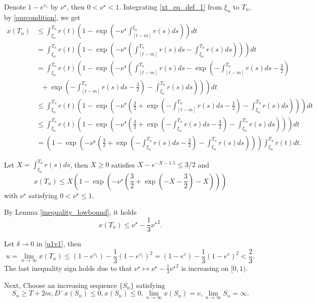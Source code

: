 \documentclass{HZNUMCM}
\begin{document}
Denote $1-e^{v_1}$ by $\nu^\star$, then $0<\nu^\star<1$. Integrating \eqref{xt_eq_def_1} from $\xi_n$ to $T_n$, by \eqref{ourcondition}, we get
\begin{align*}
x(T_n)&\leqslant \int_{\xi_n}^{T_n}r(t)\left(1-\exp\left(-\nu^\star\int_{[t-m]}^{\xi_n}r(s)ds\right)\right)dt\\
&= \int_{\xi_n}^{T_n}r(t)\left(1-\exp\left(-\nu^\star\left(\int_{[t-m]}^{T_n}r(s)ds-\int_{\xi_n}^{T_n}r(s)ds\right)\right)\right)dt\\
&= \int_{\xi_n}^{T_n}r(t)\left(1-\exp\left(-\nu^\star\left(\int_{[t-m]}^{T_n}r(s)ds-\exp{\left(-\int_{[t-m]}^{T_n}r(s)ds -\frac 3 2\right)}\right.\right.\right.\\
&\left.\left.\left.~~~+\exp{\left(-\int_{[t-m]}^{T_n}r(s)ds -\frac 3 2\right)}-\int_{\xi_n}^{T_n}r(s)ds\right)\right)\right)dt\\
&\leqslant \int_{\xi_n}^{T_n}r(t)\left(1-\exp\left(-\nu^\star\left(\frac 3 2+\exp{\left(-\int_{[t-m]}^{T_n}r(s)ds -\frac 3 2\right)}-\int_{\xi_n}^{T_n}r(s)ds\right)\right)\right)dt\\
&\leqslant\int_{\xi_n}^{T_n}r(t)\left(1-\exp\left(-\nu^\star\left(\frac 3 2+\exp{\left(-\int_{\xi_n}^{T_n}r(s)ds -\frac 3 2\right)}-\int_{\xi_n}^{T_n}r(s)ds\right)\right)\right)dt\\
&=\left(1-\exp\left(-\nu^\star\left(\frac 3 2+\exp{\left(-\int_{\xi_n}^{T_n}r(s)ds -\frac 3 2\right)}-\int_{\xi_n}^{T_n}r(s)ds\right)\right)\right)\int_{\xi_n}^{T_n}r(t)dt.
\end{align*}

Let $X=\int_{\xi_n}^{T_n}r(s)ds$, then $X\geqslant 0$ satisfies $X-e^{-X-1.5}\leqslant 3/2$ and
$$
x(T_n)\leqslant X\left(1-\exp\left(-\nu^\star\left(\frac 3 2+\exp{\left(-X -\frac 3 2\right)}-X\right)\right)\right)
$$with $\nu^\star$ satisfying $0<\nu^\star\leqslant 1$.

By Lemma \ref{inequality_lowbound}, it holds
$$
x(T_n)\leqslant \nu^\star-\frac 1 3 {\nu^\star}^2.
$$

Let $\delta\rightarrow 0$ in \eqref{u1v1}, then
\begin{equation}\label{u_bound}
u=\lim_{n\rightarrow\infty}x(T_n)\leqslant(1-e^{v_1})-\frac 1 3(1-e^{v_1})^2=(1-e^{v})-\frac 1 3(1-e^{v})^2< \frac 2 3.
\end{equation}
The last inequality sign holds due to that $\nu^\star\mapsto\nu^\star-\frac 1 3 {\nu^\star}^2$ is increasing on $[0,1)$.




Next, Choose an increasing sequence $\{S_n\}$ satisfying
$$
S_n\geqslant T+2m, D^- x(S_n)\leqslant 0, x(S_n)\leqslant 0,\lim_{n\rightarrow\infty}x(S_n)=v, \lim_{n\rightarrow \infty}S_n=\infty.
$$
\end{document}
